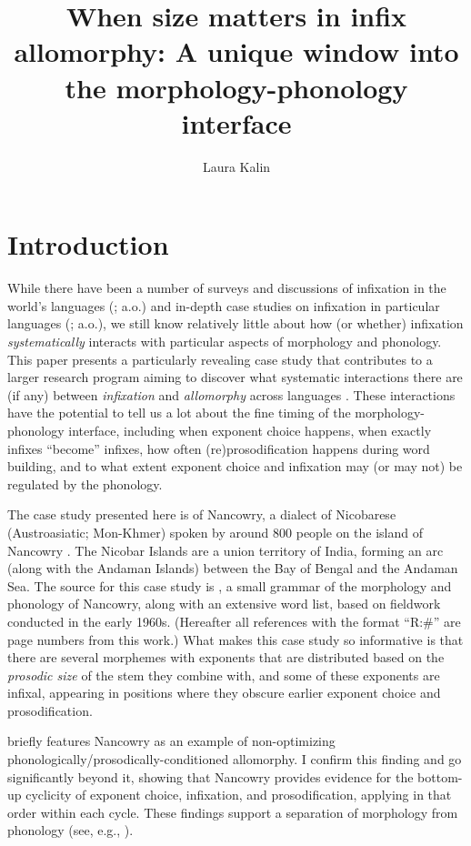 \documentclass[output=paper]{langscibook}
\author{Laura Kalin\affiliation{Princeton University}}
\title[When size matters in infix allomorphy]
      {When size matters in infix allomorphy: A unique window into the morphology-phonology interface}
\begin{document}
\maketitle
\section{Introduction}


While there have been a number of surveys and discussions of infixation in the world's languages (\citealt{Mor77,Mor00,Ultan75,Yu07,Stek12,Blevins14}; a.o.) and in-depth case studies on infixation in particular languages (\citealt{HM91,Blevins99,Harizanov17,Yu17}; a.o.), we still know relatively little about how (or whether) infixation {\it systematically} interacts with particular aspects of morphology and phonology. This paper presents a particularly revealing case study that contributes to a larger research program aiming to discover what systematic interactions there are (if any) between {\it infixation} and {\it allomorphy} across languages \citep{KalinIP}. These interactions have the potential to tell us a lot about the fine timing of the morphology-phonology interface, including when exponent choice happens, when exactly infixes ``become'' infixes, how often (re)prosodification happens during word building, and to what extent exponent choice and infixation may (or may not) be regulated by the phonology. %

The case study presented here is of Nancowry, a dialect of Nicobarese (Austroasiatic; Mon-Khmer) spoken by around 800 people on the island of Nancowry \citep[3]{Rad81}. The Nicobar Islands are a union territory of India, forming an arc (along with the Andaman Islands) between the Bay of Bengal and the Andaman Sea. The source for this case study is \citealt{Rad81}, a small grammar of the morphology and phonology of Nancowry, along with an extensive word list, based on fieldwork conducted in the early 1960s. (Hereafter all references with the format ``R:\#'' are page numbers from this work.) What makes this case study so informative is that there are several morphemes with exponents that are distributed based on the {\it prosodic size} of the stem they combine with, and some of these exponents are infixal, appearing in positions where they obscure earlier exponent choice and prosodification. 

\citet{Paster05,Paster06} briefly features Nancowry as an example of non-optimizing phonologically/prosodically-conditioned allomorphy. I confirm this finding and go significantly beyond it, showing that Nancowry provides evidence for the bottom-up cyclicity of exponent choice, infixation, and prosodification, applying in that  order within each cycle. These findings support a separation of morphology from phonology (see, e.g., \citealt{HalleMarantz93,HalleMarantz94,Trommer01,Paster06,Yu07,Embick10,BS12,Pak16,Dawson17,KalinIP,Kalin20,Rolle20,Stanton20}).
\end{document}
